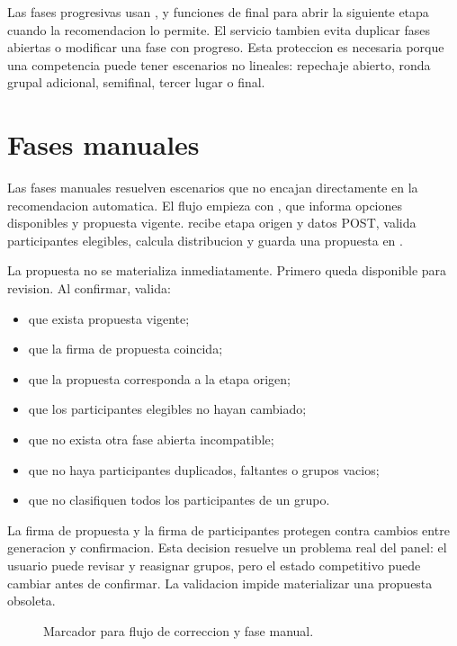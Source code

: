 Las fases progresivas usan ,  y funciones de final para abrir la siguiente etapa cuando la recomendacion lo permite. El servicio tambien evita duplicar fases abiertas o modificar una fase con progreso. Esta proteccion es necesaria porque una competencia puede tener escenarios no lineales: repechaje abierto, ronda grupal adicional, semifinal, tercer lugar o final.

\section{Fases manuales}
\label{sec:servicios-fases-manuales}

Las fases manuales resuelven escenarios que no encajan directamente en la recomendacion automatica. El flujo empieza con , que informa opciones disponibles y propuesta vigente.  recibe etapa origen y datos POST, valida participantes elegibles, calcula distribucion y guarda una propuesta en .

La propuesta no se materializa inmediatamente. Primero queda disponible para revision. Al confirmar,  valida:

\begin{itemize}
  \item que exista propuesta vigente;
  \item que la firma de propuesta coincida;
  \item que la propuesta corresponda a la etapa origen;
  \item que los participantes elegibles no hayan cambiado;
  \item que no exista otra fase abierta incompatible;
  \item que no haya participantes duplicados, faltantes o grupos vacios;
  \item que no clasifiquen todos los participantes de un grupo.
\end{itemize}

La firma de propuesta y la firma de participantes protegen contra cambios entre generacion y confirmacion. Esta decision resuelve un problema real del panel: el usuario puede revisar y reasignar grupos, pero el estado competitivo puede cambiar antes de confirmar. La validacion impide materializar una propuesta obsoleta.

\begin{figure}[H]
  \centering
  \caption{Marcador para flujo de correccion y fase manual.}
  \label{fig:servicios-fase-manual}
\end{figure}

